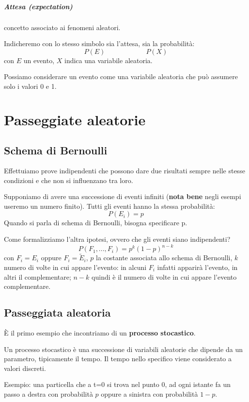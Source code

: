 \documentclass[a4paper,12pt]{book}
\begin{document}
\paragraph{Attesa (expectation)} concetto associato ai fenomeni aleatori.  

Indicheremo con lo stesso simbolo sia l'attesa, sia la probabilità: $$P(E) \qquad \qquad \qquad P(X)$$ con $E$ un evento, $ X $ indica una variabile aleatoria. 

Possiamo considerare un evento come una variabile aleatoria che può assumere solo i valori 0 e 1. 

\chapter{Passeggiate aleatorie}
\section{Schema di Bernoulli}
Effettuiamo prove indipendenti che possono dare due risultati sempre nelle stesse condizioni e che non si influenzano tra loro. 

Supponiamo di avere una successione di eventi infiniti (\textbf{nota bene} negli esempi useremo un numero finito).
Tutti gli eventi hanno la stessa probabilità:
$$P(E_i) = p$$
Quando si parla di schema di Bernoulli, bisogna specificare p.

Come formalizziamo l'altra ipotesi, ovvero che gli eventi siano indipendenti?
$$P (F_1, ..., F_i ) = p^k(1-p)^{n-k}$$
con $ F_i = E_i $ oppure $ F_i = \widetilde{E}_i $, $ p $ la costante associata allo schema di Bernoulli, $ k $ numero di volte in cui appare l'evento: in alcuni $ F_i $ infatti apparirà l'evento, in altri il complementare; $ n-k $ quindi è il numero di volte in cui appare l'evento complementare.

\section{Passeggiata aleatoria}
È il primo esempio che incontriamo di un \textbf{processo stocastico}. 

Un processo stocastico è una successione di variabili aleatorie che dipende da un parametro, tipicamente il tempo. Il tempo nello specifico viene considerato a valori discreti. 

Esempio: una particella che a t=0 si trova nel punto 0, ad ogni istante fa un passo a destra con probabilità $ p $ oppure a sinistra con probabilità $ 1-p $. 
\end{document}
